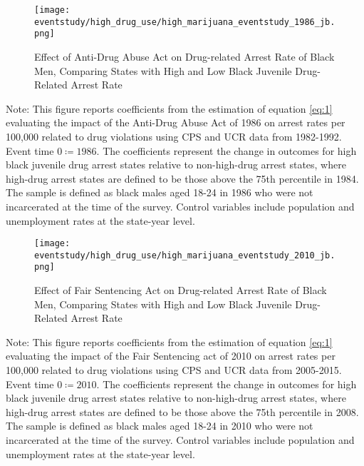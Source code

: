 \clearpage

  \begin{figure}[h]
    \caption{Effect of Anti-Drug Abuse Act on Drug-related Arrest Rate of Black Men, Comparing States with High and Low Black Juvenile Drug-Related Arrest Rate}
    \centering
    \texttt{[image: eventstudy/high\_drug\_use/high\_marijuana\_eventstudy\_1986\_jb.png]}
    \label{fig:jb_es_1986}
  \end{figure}

  \begin{footnotesize}
    \noindent Note: This figure reports coefficients from the estimation of equation \ref{eq:1} evaluating the impact of the Anti-Drug Abuse Act of 1986 on arrest rates per 100,000 related to drug violations using CPS and UCR data from 1982-1992. Event time $0 \coloneqq 1986$. The coefficients represent the change in outcomes for high black juvenile drug arrest states relative to non-high-drug arrest states, where high-drug arrest states are defined to be those above the 75th percentile in 1984. The sample is defined as black males aged 18-24 in 1986 who were not incarcerated at the time of the survey. Control variables include population and unemployment rates at the state-year level. 
  \end{footnotesize}

\clearpage

\begin{figure}[h]
    \caption{Effect of Fair Sentencing Act on Drug-related Arrest Rate of Black Men, Comparing States with High and Low Black Juvenile Drug-Related Arrest Rate}
    \centering
    \texttt{[image: eventstudy/high\_drug\_use/high\_marijuana\_eventstudy\_2010\_jb.png]}
    \label{fig:jb_es_2010}
  \end{figure}

  \begin{footnotesize}
    \noindent Note: This figure reports coefficients from the estimation of equation \ref{eq:1} evaluating the impact of the Fair Sentencing act of 2010 on arrest rates per 100,000 related to drug violations using CPS and UCR data from 2005-2015. Event time $0 \coloneqq 2010$. The coefficients represent the change in outcomes for high black juvenile drug arrest states relative to non-high-drug arrest states, where high-drug arrest states are defined to be those above the 75th percentile in 2008. The sample is defined as black males aged 18-24 in 2010 who were not incarcerated at the time of the survey. Control variables include population and unemployment rates at the state-year level. 
  \end{footnotesize}

